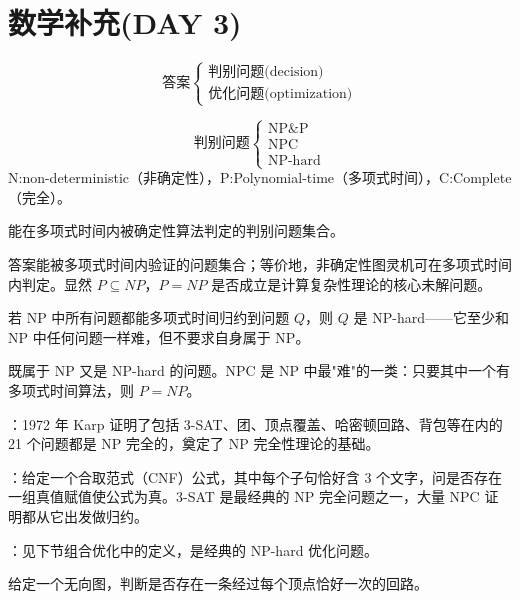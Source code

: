 \documentclass[12pt]{article}
\begin{document}
\section{数学补充(DAY 3)}
\[
  \text{答案}\begin{cases}
    \text{判别问题(decision)} \\
    \text{优化问题(optimization)}
  \end{cases}
\]
\begin{exam}
  \[
    \text{判别问题}\begin{cases}
      \text{NP}\& \text{P} \\
      \text{NPC}           \\
      \text{NP-hard}
    \end{cases}
  \]
  N:non-deterministic（非确定性），P:Polynomial-time（多项式时间），C:Complete（完全）。
\end{exam}
\begin{defn}[P 类]
  能在多项式时间内被确定性算法判定的判别问题集合。
\end{defn}

\begin{defn}[NP 类]
  答案能被多项式时间内验证的问题集合；等价地，非确定性图灵机可在多项式时间内判定。显然 $P\subseteq NP$，$P=NP$ 是否成立是计算复杂性理论的核心未解问题。
\end{defn}

\begin{defn}[NP-hard]
  若 NP 中所有问题都能多项式时间归约到问题 $Q$，则 $Q$ 是 NP-hard——它至少和 NP 中任何问题一样难，但不要求自身属于 NP。
\end{defn}

\begin{defn}[NPC（NP 完全）]
  既属于 NP 又是 NP-hard 的问题。NPC 是 NP 中最"难"的一类：只要其中一个有多项式时间算法，则 $P=NP$。
\end{defn}
\begin{exam}
  ：1972 年 Karp 证明了包括 3-SAT、团、顶点覆盖、哈密顿回路、背包等在内的 21 个问题都是 NP 完全的，奠定了 NP 完全性理论的基础。

  ：给定一个合取范式（CNF）公式，其中每个子句恰好含 3 个文字，问是否存在一组真值赋值使公式为真。3-SAT 是最经典的 NP 完全问题之一，大量 NPC 证明都从它出发做归约。

  ：见下节组合优化中的定义，是经典的 NP-hard 优化问题。
\end{exam}
\begin{defn}[哈密顿回路问题]
  给定一个无向图，判断是否存在一条经过每个顶点恰好一次的回路。
\end{defn}
\end{document}
